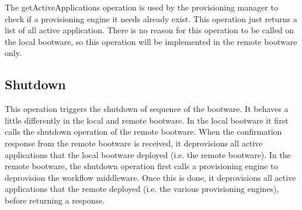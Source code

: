 The getActiveApplications operation is used by the provisioning manager to check if a provisioning engine it needs already exist.
This operation just returns a list of all active application.
There is no reason for this operation to be called on the local bootware, so this operation will be implemented in the remote bootware only.

\subsection{Shutdown}

This operation triggers the shutdown of sequence of the bootware.
It behaves a little differently in the local and remote bootware.
In the local bootware it first calls the shutdown operation of the remote bootware.
When the confirmation response from the remote bootware is received, it deprovisions all active applications that the local bootware deployed (i.e. the remote bootware).
In the remote bootware, the shutdown operation first calls a provisioning engine to deprovision the workflow middleware.
Once this is done, it deprovisions all active applications that the remote deployed (i.e. the various provisioning engines), before returning a response.
